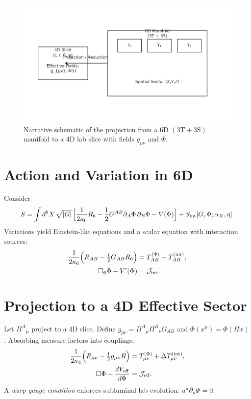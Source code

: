 \documentclass[12pt]{article}
\begin{document}
\begin{figure}[h]
  \centering
  \includegraphics[width=\linewidth]{figures/fig_projection_6D_to_4D.png}
  \caption{Narrative schematic of the projection from a 6D $(3\mathrm{T}+3\mathrm{S})$ manifold to a 4D lab slice with fields $g_{\mu\nu}$ and $\Phi$.}
\end{figure}

\section{Action and Variation in 6D}
Consider
\begin{equation}
S=\int d^6X\,\sqrt{|G|}\,\Big[\frac{1}{2\kappa_6}R_6 - \frac{1}{2}G^{AB}\partial_A\Phi\,\partial_B\Phi - V(\Phi)\Big] + S_{\rm int}[G,\Phi;\alpha_X,\eta].
\end{equation}
Variations yield Einstein-like equations and a scalar equation with interaction sources:
\begin{align}
\frac{1}{2\kappa_6}\Big(R_{AB}-\tfrac{1}{2}G_{AB}R_6\Big) &= T^{(\Phi)}_{AB} + T^{\rm (int)}_{AB},\\
\Box_6\Phi - V'(\Phi) &= \mathcal{J}_{\rm int}.
\end{align}

\section{Projection to a 4D Effective Sector}
Let $\Pi^A{}_{\mu}$ project to a 4D slice. Define $g_{\mu\nu}=\Pi^A{}_{\mu}\Pi^B{}_{\nu}G_{AB}$ and $\Phi(x^\mu)=\Phi(\Pi x)$. Absorbing measure factors into couplings,
\begin{align}
\frac{1}{2\kappa_4}\Big(R_{\mu\nu}-\tfrac{1}{2}g_{\mu\nu}R\Big) &= T^{(\Phi)}_{\mu\nu} + \Delta T^{\rm (int)}_{\mu\nu},\\
\Box\Phi - \frac{dV_{\rm eff}}{d\Phi} &= \mathcal{J}_{\rm eff}.
\end{align}
A \emph{warp gauge condition} enforces subluminal lab evolution: $u^\mu\partial_\mu\Phi=0$.
\end{document}
